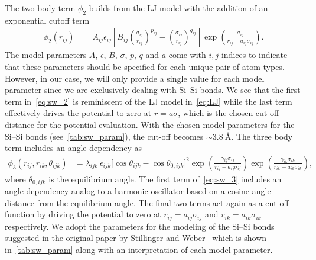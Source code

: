 The two-body term $\phi_2$ builds from the \acrshort{LJ} model with the addition of an exponential cutoff term
\begin{align}
  \phi_2(r_{i j}) & =A_{ij} \epsilon_{ij}\left[B_{ij}\left(\frac{\sigma_{ij}}{r_{ij}}\right)^{p_{ij}} - \left(\frac{\sigma_{ij}}{r_{ij}}\right)^{q_{ij}}\right] \exp \left(\frac{\sigma_{ij}}{r_{ij}-a_{ij} \sigma_{ij}}\right).
  \label{eq:sw_2}
\end{align}
The model parameters $A$, $\epsilon$, $B$, $\sigma$, $p$, $q$ and $a$ come with
$i,j$ indices to indicate that these parameters should be specified for each
unique pair of atom types. However, in our case, we will only provide a single
value for each model parameter since we are exclusively dealing with Si--Si bonds. We see that the first term in~\cref{eq:sw_2} is reminiscent of the \acrshort{LJ} model in~\cref{eq:LJ} while the last term effectively drives the potential to zero at $r=a\sigma$, which is the chosen cut-off distance for the potential evaluation. With the chosen model parameters for the Si--Si bonds (see~\cref{tab:sw_param}), the cut-off becomes $\sim \SI{3.8}{\text{Å}}$. The three body term includes an angle dependency as
\begin{align}
  \phi_3(r_{ij}, r_{ik}, \theta_{ijk}) &= \lambda_{ijk} \ \epsilon_{ijk} \Big[\cos \theta_{ijk}-\cos \theta_{0,ijk}\Big]^2 \exp \left(\frac{\gamma_{ij} \sigma_{ij}}{r_{ij} - a_{ij} \sigma_{ij}}\right) \exp \left(\frac{\gamma_{ik} \sigma_{ik}}{r_{ik} - a_{ik} \sigma_{ik}}\right),
  \label{eq:sw_3}
\end{align}
where $\theta_{0,ijk}$ is the equilibrium angle. The first term of~\cref{eq:sw_3} includes an angle dependency analog to a harmonic oscillator
based on a cosine angle distance from the equilibrium angle. The final two terms
act again as a cut-off function by driving the potential to zero at $r_{ij} =
a_{ij}\sigma_{ij}$ and $r_{ik} = a_{ik}\sigma_{ik}$ respectively. We adopt the parameters for the modeling of the Si--Si bonds suggested in the original paper by Stillinger and Weber~\cite{PhysRevB.31.5262} which is shown in~\cref{tab:sw_param} along with an interpretation of each model parameter.



